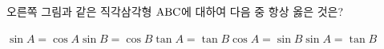 \noindent\begin{minipage}[t]{0.58\linewidth}\vspace{0pt}\raggedright 오른쪽 그림과 같은 직각삼각형 $\mathrm{ABC}$에 대하여 다음 중 항상 옳은 것은?\end{minipage}\hfill\begin{minipage}[t]{0.4\linewidth}\vspace{0pt}\centering \resizebox{\ifdim\width>\linewidth\linewidth\else\width\fi}{!}{}\end{minipage}\par
\begin{choicesv}{$\sin A=\cos A$}{$\sin B=\cos B$}{$\tan A=\tan B$}{$\cos A=\sin B$}{$\sin A=\tan B$}\end{choicesv}
